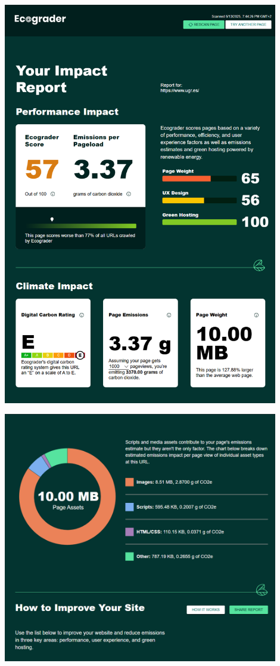 \documentclass[12pt,a4paper]{report}
\begin{document}
\begin{center}
    \includegraphics[width=0.9\textwidth]{imagenes/Ecograder_2.png}
\end{center}

\begin{center}
    \includegraphics[width=0.9\textwidth]{imagenes/Ecograder_3.png}
\end{center}
\end{document}
